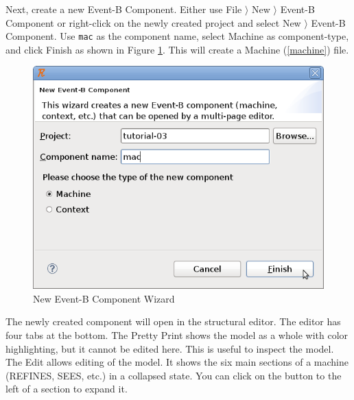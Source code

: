 
Next, create a new Event-B Component.  Either use \textsf{File $\rangle$ New $\rangle$ Event-B Component} or right-click on the newly created project and select \textsf{New $\rangle$ Event-B Component}.  Use \texttt{mac} as the component name, select \textsf{Machine} as component-type, and click \textsf{Finish} as shown in Figure \ref{fig_tut_03_new_component_wizard}. This will create a Machine (\ref{machine}) file.

\begin{figure}[!ht]
\begin{center}
	\includegraphics[]{img/tutorial/tut_03_mac.png}
	\caption{New Event-B Component Wizard}
	\label{fig_tut_03_new_component_wizard}
\end{center}
\end{figure}

The newly created component will open in the structural editor.  The editor has four tabs at the bottom.  The \textsf{Pretty Print} shows the model as a whole with color highlighting, but it cannot be edited here.  This is useful to inspect the model.  The \textsf{Edit} allows editing of the model.  It shows the six main sections of a machine (REFINES, SEES, etc.) in a collapsed state.  You can click on the  button to the left of a section to expand it.


